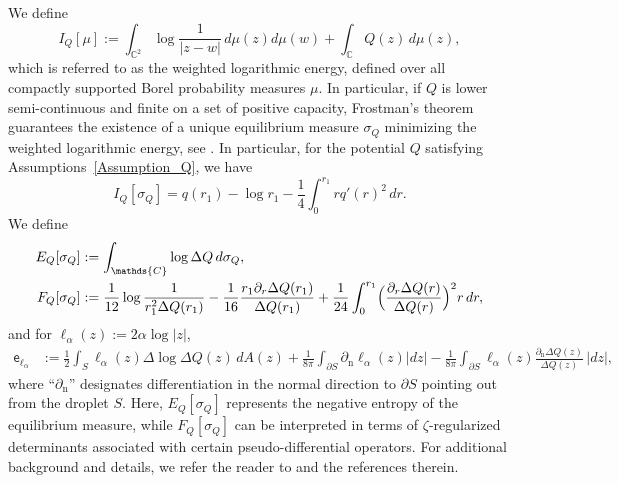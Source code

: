 \documentclass[reqno]{amsart}
\newcommand{\1}{\mathds{1}}
\newcommand{\C}{\mathds{C}}
\numberwithin{equation}{section}
\theoremstyle{definition}
\begin{document}
We define
\begin{equation}
I_{Q}[\mu]:=\int_{\C^2}\log \frac{1}{|z-w|}\,d\mu(z)d\mu(w)+\int_{\C}Q(z)\,d\mu(z),   
\end{equation}
which is referred to as the weighted logarithmic energy, defined over all compactly supported Borel probability measures $\mu$.
In particular, if $Q$ is lower semi-continuous and finite on a set of positive capacity, Frostman’s theorem guarantees the existence of a unique equilibrium measure $\sigma_Q$ minimizing the weighted logarithmic energy, see \cite{SaTo}.
In particular, for the potential $Q$ satisfying Assumptions~\ref{Assumption_Q}, we have
\[
I_{Q}[\sigma_Q]
=q(r_1)-\log r_1-\frac{1}{4}\int_{0}^{r_1}rq'(r)^2\,dr.
\]
We define 
\begin{align*}
E_{Q}[\sigma_{Q}]&:=\int_{\C}\log \Delta Q\,d\sigma_{Q}, 
\\
F_{Q}[\sigma_{Q}]&:=\frac{1}{12}\log\frac{1}{r_1^2\Delta Q(r_1)}-\frac{1}{16}\frac{r_1\partial_r\Delta Q(r_1)}{\Delta Q(r_1)}+\frac{1}{24}\int_0^{r_1}\Bigl(\frac{\partial_r\Delta Q(r)}{\Delta Q(r)}\Bigr)^2r\,dr, 
\end{align*}
and for $\ell_{\alpha}(z):=2\alpha\log |z|$, 
\begin{align*}
\mathsf{e}_{\ell_{\alpha}}
&:=
\frac{1}{2}\int_{S}\ell_{\alpha}(z)\Delta \log \Delta Q(z)\,dA(z)+\frac{1}{8\pi}\int_{\partial S}\partial_{\mathrm{n}}\ell_{\alpha}(z)|dz|-\frac{1}{8\pi}\int_{\partial S}\ell_{\alpha}(z)\frac{\partial_{\mathrm{n}}\Delta Q(z)}{\Delta Q(z)}\,|dz|, 
\end{align*}
where “$\partial_{\mathrm{n}}$” designates differentiation in the normal direction to $\partial S$ pointing out from the droplet $S$. 
Here, $E_{Q}[\sigma_Q]$ represents the negative entropy of the equilibrium measure, while $F_{Q}[\sigma_Q]$ can be interpreted in terms of $\zeta$-regularized determinants associated with certain pseudo-differential operators. For additional background and details, we refer the reader to \cite{BKS2023,ACC2023c} and the references therein. 
\end{document}
